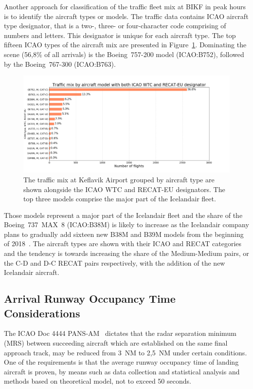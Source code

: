 Another approach for classification of the traffic fleet mix at BIKF in peak hours is to identify the aircraft types or models. The traffic data contains ICAO aircraft type designator, that is a two-, three- or four-character code comprising of numbers and letters. This designator is unique for each aircraft type. The top fifteen ICAO types of the aircraft mix are presented in Figure~\ref{fig:traffic_mix_by_model}. Dominating the scene (56,8\% of all arrivals) is the Boeing~757-200 model (ICAO:B752), followed by the Boeing~767-300 (ICAO:B763).
\begin{figure}[h]
    \centering
    \includegraphics[width=1\textwidth]{graphics/fig_traffic_mix_by_model.png}
    \caption[Traffic mix by aircraft model.]{The traffic mix at Keflavik Airport grouped by aircraft type are shown alongside the ICAO WTC and RECAT-EU designators. The top three models comprise the major part of the Icelandair fleet.}
    \label{fig:traffic_mix_by_model}
\end{figure}
 Those models represent a major part of the Icelandair fleet and the share of the Boeing~737~MAX~8 (ICAO:B38M) is likely to increase as the Icelandair company plans to gradually add sixteen new B38M and B39M models from the beginning of 2018~\cite{icelandair_fleet}. The aircraft types are shown with their ICAO and RECAT categories and the tendency is towards increasing the share of the Medium-Medium pairs, or the C-D and D-C RECAT pairs respectively, with the addition of the new Icelandair aircraft.


\subsection{Arrival Runway Occupancy Time Considerations}\label{ssec:AROT_considerations} 

The ICAO Doc 4444 PANS-AM~\cite{doc44444} dictates that the radar separation minimum (MRS) between succeeding aircraft which are established on the same final approach track, may be reduced from 3~NM to 2,5~NM under certain conditions. One of the requirements is that the average runway occupancy time of landing aircraft is proven, by means such as data collection and statistical analysis and methods based on theoretical model, not to exceed 50 seconds. 

